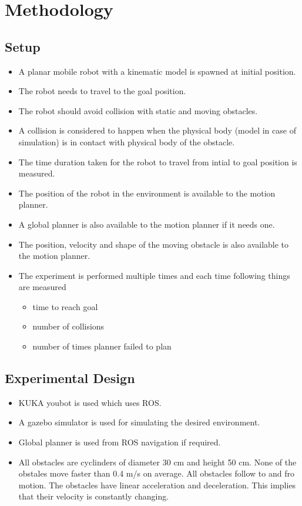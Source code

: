 \chapter{Methodology}

\section{Setup}
\begin{itemize}
    \item A planar mobile robot with a kinematic model is spawned at initial position. 
    \item The robot needs to travel to the goal position. 
    \item The robot should avoid collision with static and moving obstacles. 
    \item A collision is considered to happen when the physical body (model in case of simulation)
        is in contact with physical body of the obstacle.
    \item The time duration taken for the robot to travel from intial to goal position is measured.
    \item The position of the robot in the environment is available to the motion planner.
    \item A global planner is also available to the motion planner if it needs one.
    \item The position, velocity and shape of the moving obstacle is also available to the motion
        planner.
    \item The experiment is performed multiple times and each time following things are measured
        \begin{itemize}
            \item time to reach goal
            \item number of collisions
            \item number of times planner failed to plan
        \end{itemize}
\end{itemize}

\section{Experimental Design}
\begin{itemize}
    \item KUKA youbot\cite{bischoff2011kuka} is used which uses ROS\cite{quigley2009ros}. 
    \item A gazebo simulator\cite{koenig2004design} is used for simulating the desired environment.
    \item Global planner is used from ROS navigation\cite{rosnavigation} if required. 
    \item All obstacles are cyclinders of diameter 30 cm and height 50 cm. None of the obstales move 
        faster than 0.4 m/s on average. All obstacles follow to and fro motion. The obstacles have 
        linear acceleration and deceleration. This implies that their velocity is constantly changing.
\end{itemize}

